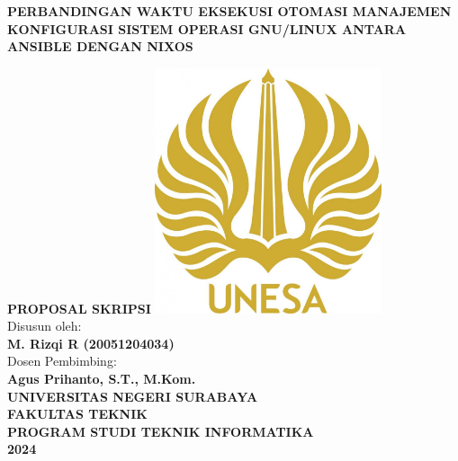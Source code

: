 \begin{titlepage}
	\begin{center}
		{\large \textbf{PERBANDINGAN WAKTU EKSEKUSI OTOMASI MANAJEMEN KONFIGURASI SISTEM OPERASI GNU/LINUX ANTARA ANSIBLE DENGAN NIXOS\\}}
		\vspace{0.5cm}

		\textbf{PROPOSAL SKRIPSI}
		\vfill
		\includegraphics[width=0.5\textwidth]{images/unesa.jpg}\\
		\vspace*{1cm}
		Disusun oleh:\\
		\textbf{M. Rizqi R (20051204034)}\\
		Dosen Pembimbing:\\
		\textbf{Agus Prihanto, S.T., M.Kom.}\\
		\vfill
		{\large \textbf{UNIVERSITAS NEGERI SURABAYA\\ FAKULTAS TEKNIK \\ PROGRAM STUDI TEKNIK INFORMATIKA \\ 2024}}
	\end{center}
\end{titlepage}
